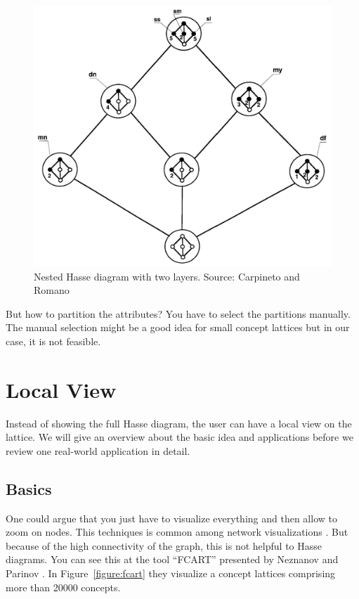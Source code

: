 \documentclass[11pt]{report}
\begin{document}
\begin{figure}[!ht]
	\centering
	\includegraphics[width=\linewidth]{./images/nested}
\caption{Nested Hasse diagram with two layers. Source: Carpineto and Romano \cite{carpineto2004concept}}
\label{figure:nested}
\end{figure}
	
But how to partition the attributes? You have to select the partitions manually. The manual selection might be a good idea for small concept lattices but in our case, it is not feasible.

\section{Local View}
\label{Local View}

Instead of showing the full Hasse diagram, the user can have a local view on the lattice. We will give an overview about the basic idea and applications before we review one real-world application in detail.

\subsection{Basics}

One could argue that you just have to visualize everything and then allow to zoom on nodes. This techniques is common among network visualizations \cite{Herman2000}. But because of the high connectivity of the graph, this is not helpful to Hasse diagrams. You can see this at the tool ``FCART'' presented by Neznanov and Parinov \cite{Neznanov2014}. In Figure~\ref{figure:fcart} they visualize a concept lattices comprising more than 20000 concepts. \\
\end{document}
